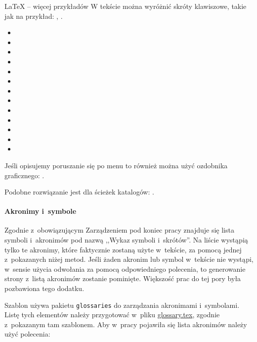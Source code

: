 \begin{easyappendix}{\LaTeX{} -- więcej przykładów}
W tekście można wyróżnić skróty klawiszowe, takie jak na przykład: , \keys{\ctrl, \Alt, \del}.
\begin{itemize}
	\item {}
	\item \keys{\Space} \keys{\SPACE}
	\item \keys{\backspace} \keys{\del} \keys{\backdel}
	\item \keys{\return} \keys{\enter}
	\item \keys{\shift} \keys{\capslock}
	\item \keys{\ctrl} \keys{\Alt} \keys{\AltGr}
	\item \keys{\tab}
	\item \keys{\esc} \keys{\oldesc}
	\item \keys{\winmenu}
	\item \keys{\arrowkey{^}} \keys{\arrowkeyup}
	\item {} \keys{\arrowkeydown}
	\item \keys{\arrowkey{>}} \keys{\arrowkeyright}
	\item \keys{\arrowkey{<}} \keys{\arrowkeyleft}
\end{itemize}

Jeśli opisujemy poruszanie się po menu to również można użyć ozdobnika graficznego: .

Podobne rozwiązanie jest dla ścieżek katalogów: .

\paragraph{Akronimy i~symbole}
Zgodnie z~obowiązującym Zarządzeniem pod koniec pracy znajduje się lista symboli i~akronimów pod nazwą ,,Wykaz symboli i~skrótów''. Na liście wystąpią tylko te akronimy, które faktycznie zostaną użyte w~tekście, za pomocą jednej z~pokazanych niżej metod. Jeśli żaden akronim lub symbol w~tekście nie wystąpi, w~sensie użycia odwołania za pomocą odpowiedniego polecenia, to generowanie strony z~listą akronimów zostanie pominięte. Większość prac do tej pory była pozbawiona tego dodatku.

Szablon używa pakietu \texttt{glossaries} do zarządzania akronimami i~symbolami. Listę tych elementów należy przygotować w~pliku \href{./glossary.tex}{glossary.tex}, zgodnie z~pokazanym tam szablonem. Aby w~pracy pojawiła się lista akronimów należy użyć polecenia:


\end{easyappendix}

